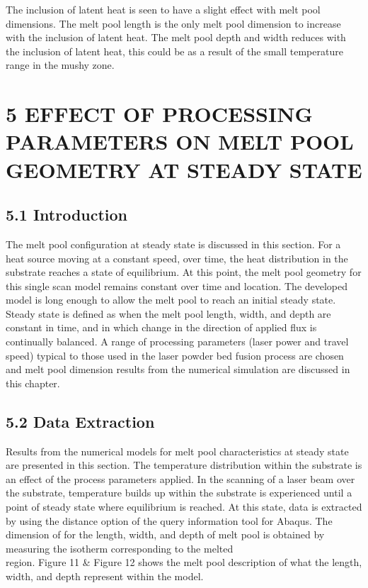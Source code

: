 \documentclass[10pt]{article}
\begin{document}
The inclusion of latent heat is seen to have a slight effect with melt pool dimensions. The melt pool length is the only melt pool dimension to increase with the inclusion of latent heat. The melt pool depth and width reduces with the inclusion of latent heat, this could be as a result of the small temperature range in the mushy zone.

\section*{5 EFFECT OF PROCESSING PARAMETERS ON MELT POOL GEOMETRY AT STEADY STATE}
\subsection*{5.1 Introduction}
The melt pool configuration at steady state is discussed in this section. For a heat source moving at a constant speed, over time, the heat distribution in the substrate reaches a state of equilibrium. At this point, the melt pool geometry for this single scan model remains constant over time and location. The developed model is long enough to allow the melt pool to reach an initial steady state. Steady state is defined as when the melt pool length, width, and depth are constant in time, and in which change in the direction of applied flux is continually balanced. A range of processing parameters (laser power and travel speed) typical to those used in the laser powder bed fusion process are chosen and melt pool dimension results from the numerical simulation are discussed in this chapter.

\subsection*{5.2 Data Extraction}
Results from the numerical models for melt pool characteristics at steady state are presented in this section. The temperature distribution within the substrate is an effect of the process parameters applied. In the scanning of a laser beam over the substrate, temperature builds up within the substrate is experienced until a point of steady state where equilibrium is reached. At this state, data is extracted by using the distance option of the query information tool for Abaqus. The dimension of for the length, width, and depth of melt pool is obtained by measuring the isotherm corresponding to the melted\\
region. Figure 11 \& Figure 12 shows the melt pool description of what the length, width, and depth represent within the model.
\end{document}
